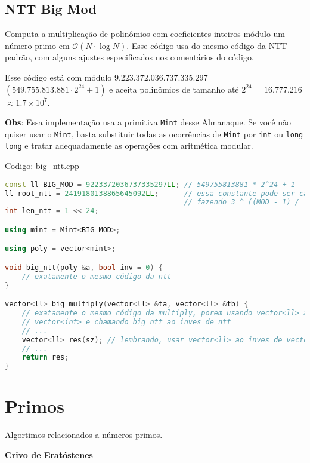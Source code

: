 \documentclass[10pt, a4paper, oneside]{book}
\begin{document}
\subsection{NTT Big Mod}


Computa a multiplicação de polinômios com coeficientes inteiros módulo um número primo em $\mathcal{O}(N \cdot \log N)$. Esse código usa do mesmo código da NTT padrão, com alguns ajustes especificados nos comentários do código.



Esse código está com módulo $9.223.372.036.737.335.297$ $(549.755.813.881 \cdot 2^{24} + 1)$ e aceita polinômios de tamanho até $2^{24}$ = $16.777.216$ $\approx 1.7 \times 10^7$.



\textbf{Obs}: Essa implementação usa a primitiva \texttt{Mint} desse Almanaque. Se você não quiser usar o \texttt{Mint}, basta substituir todas as ocorrências de \texttt{Mint} por \texttt{int} ou \texttt{long long} e tratar adequadamente as operações com aritmética modular.
\hfill

Codigo: big\_ntt.cpp

\begin{lstlisting}[language=C++]
const ll BIG_MOD = 9223372036737335297LL; // 549755813881 * 2^24 + 1
ll root_ntt = 2419180138865645092LL;      // essa constante pode ser calculada
                                          // fazendo 3 ^ ((MOD - 1) / (1 << 24))
int len_ntt = 1 << 24;

using mint = Mint<BIG_MOD>;

using poly = vector<mint>;

void big_ntt(poly &a, bool inv = 0) {
    // exatamente o mesmo código da ntt
}

vector<ll> big_multiply(vector<ll> &ta, vector<ll> &tb) {
    // exatamente o mesmo código da multiply, porem usando vector<ll> ao inves de
    // vector<int> e chamando big_ntt ao inves de ntt
    // ...
    vector<ll> res(sz); // lembrando, usar vector<ll> ao inves de vector<int>
    // ...
    return res;
}\end{lstlisting}
\hfill

\section{Primos}


Algortimos relacionados a números primos.



\textbf{Crivo de Eratóstenes} 
\end{document}

